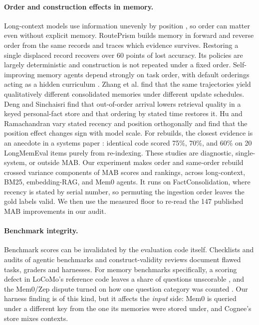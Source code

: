 \paragraph{Order and construction effects in memory.}
Long-context models use information unevenly by position \citep{liu2024lost}, so order can matter even without explicit memory. RoutePrism \citep{xu2026routeprism} builds memory in forward and reverse order from the same records and traces which evidence survives. Restoring a single displaced record recovers over 60 points of lost accuracy. Its policies are largely deterministic and construction is not repeated under a fixed order. Self-improving memory agents depend strongly on task order, with default orderings acting as a hidden curriculum \citep{ye2026fragility}. Zhang et al. \citep{zhang2026usefulmemories} find that the same trajectories yield qualitatively different consolidated memories under different update schedules. Deng and Sinchaisri \citep{deng2026stale} find that out-of-order arrival lowers retrieval quality in a keyed personal-fact store and that ordering by stated time restores it. Hu and Ramachandran \citep{hu2026trustgap} vary stated recency and position orthogonally and find that the position effect changes sign with model scale. For rebuilds, the closest evidence is an anecdote in a systems paper \citep{rajah2026postgraphrag}: identical code scored 75\%, 70\%, and 60\% on 20 LongMemEval items purely from re-indexing. These studies are diagnostic, single-system, or outside MAB. Our experiment makes order and same-order rebuild crossed variance components of MAB scores and rankings, across long-context, BM25, embedding-RAG, and Mem0 agents. It runs on FactConsolidation, where recency is stated by serial number, so permuting the ingestion order leaves the gold labels valid. We then use the measured floor to re-read the 147 published MAB improvements in our audit.

\paragraph{Benchmark integrity.}
Benchmark scores can be invalidated by the evaluation code itself. Checklists and audits of agentic benchmarks
\citep{zhu2025abc,tu2026benchguard,gao2026supportscores} and construct-validity reviews \citep{bean2025construct}
document flawed tasks, graders and harnesses. For memory benchmarks specifically, a scoring defect in LoCoMo's
reference code leaves a share of questions unscorable \citep{tanguturi2026atant}, and the Mem0/Zep dispute turned
on how one question category was counted \citep{mem0zep2025issue}. Our harness finding is of this kind, but it
affects the \emph{input} side: Mem0 is queried under a different key from the one its memories were stored under,
and Cognee's store mixes contexts.

